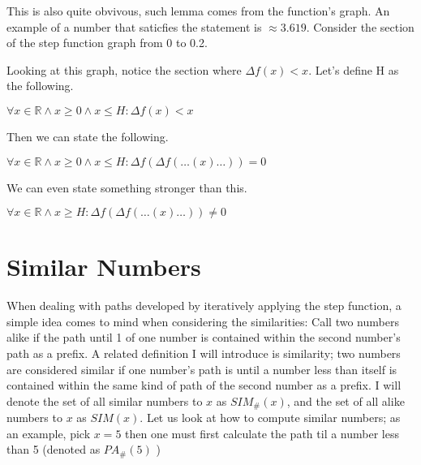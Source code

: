 \documentclass{article}
\begin{document}
This is also quite obvivous, such lemma comes from the function's graph. 
An example of a number that saticfies the statement is \(\approx 3.619\).
Consider the section of the step function graph from 0 to 0.2.


\vspace{12pt}

\begin{center}
\end{center}

\vspace{12pt}

Looking at this graph, notice the section where \(\Delta f(x) < x\). Let's define H as the following.

\begin{defin}
  \(
    \forall x \in \mathbb{R} \land x \geq 0 \land x \leq H: \Delta f(x) < x
  \)
\end{defin}

Then we can state the following.

\begin{lemma}
  \(
  \forall x \in \mathbb{R} \land x \geq 0 \land x \leq H : \Delta f(\Delta f(\ldots (x) \ldots)) = 0
  \)
\end{lemma}

We can even state something stronger than this.

\begin{theo}
  \(
    \forall x \in \mathbb{R} \land x \geq H : \Delta f(\Delta f(\ldots (x) \ldots)) \neq 0
  \)
\end{theo}

\section{Similar Numbers}

When dealing with paths developed by iteratively applying the step function, a simple idea comes to mind when considering the similarities: Call two numbers alike if the path until 1 of one number is contained within the second number's path as a prefix. A related definition I will introduce is similarity; two numbers are considered similar if one number's path is until a number less than itself is contained within the same kind of path of the second number as a prefix. I will denote the set of all similar numbers to \(x\) as \(SIM_\#(x)\), and the set of all alike numbers to \(x\) as \(SIM(x)\). Let us look at how to compute similar numbers; as an example, pick \(x = 5\) then one must first calculate the path til a number less than 5 (denoted as \(PA_\#(5)\) )
\end{document}
